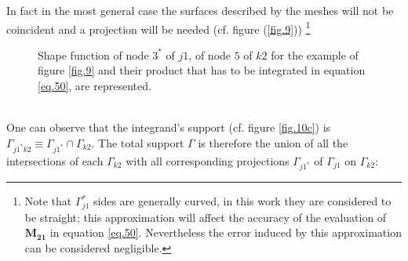 In fact in the most general case the surfaces described by the meshes will not be coincident and a projection will be needed (cf. figure (\ref{fig.9})) \footnote{Note that $\Gamma_{j1}^*$ sides are generally curved, in this work they are considered to be straight; this approximation will affect the accuracy of the evaluation of $ \mathbf{M_{21}}$ in equation \eqref{eq.50}. Nevertheless the error induced by this approximation can be considered negligible.}
\begin{figure}[!ht]
\centering
     \caption{Shape function of node $3^*$ of $j1$, of node $5$ of $k2$ for the example of figure \ref{fig.9} and their product that has to be integrated in equation  \eqref{eq.50}, are represented.}
     \label{fig.10}
   \end{figure}
   \\
   One can observe that the integrand's support (cf. figure \ref{fig.10c}) is $\Gamma_{j1^*k2}\equiv \Gamma_{j1^*} \cap  \Gamma_{k2} $. The total support $\Gamma$ is therefore the union of all the intersections of each $\Gamma_{k2}$ with all corresponding projections $\Gamma_{j1^*}$ of $\Gamma_{j1}$ on $\Gamma_{k2}$:\\
